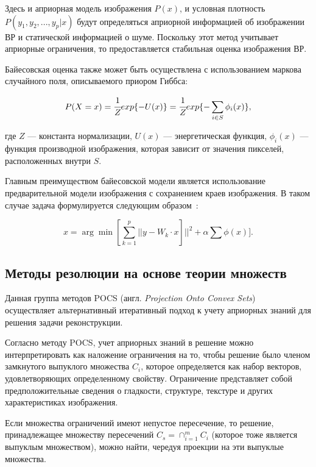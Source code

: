 Здесь и априорная модель изображения $P(x)$, и условная плотность $P(y_1, y_2, ..., y_p | x)$ будут определяться априорной информацией об изображении ВР и статической информацией о шуме. Поскольку этот метод учитывает априорные ограничения, то предоставляется стабильная оценка изображения ВР.

Байесовская оценка также может быть осуществлена с использованием маркова случайного поля, описываемого приором Гиббса:

\begin{equation}
    \displaystyle P(X = x) = \cfrac{1}{Z} exp\{-U(x)\} = \cfrac{1}{Z} exp\{-\sum_{i\in S}^{}\phi_i(x)\}, 
\end{equation}

где $Z$ --- константа нормализации, $U(x)$ --- энергетическая функция, $\phi_i(x)$ --- функция производной изображения, которая зависит от значения пикселей, расположенных внутри $S$.

Главным преимуществом байесовской модели является использование предварительной модели изображения с сохранением краев изображения. В таком случае задача формулируется следующим образом~\cite{map}:

\begin{equation}
    x = \arg \min [\sum_{k=1}^{p}||y - W_k\cdot x]||^2 + \alpha \sum_{}^{}\phi(x)].
\end{equation}

\subsection{Методы резолюции на основе теории множеств}

Данная группа методов POCS (англ. \textit{Projection Onto Convex Sets})~\cite{pocs, pocs2} осуществляет альтернативный итеративный подход к учету априорных знаний для решения задачи реконструкции.

Согласно методу POCS, учет априорных знаний в решение можно интерпретировать как наложение ограничения на то, чтобы решение было членом замкнутого выпуклого множества $C_i$, которое определяется как набор векторов, удовлетворяющих определенному свойству. Ограничение представляет собой предположительные сведения о гладкости, структуре, текстуре и других характеристиках изображения.

Если множества ограничений имеют непустое пересечение, то решение, принадлежащее множеству пересечений $C_s = \cap _{i=1}^{m}C_i$ (которое тоже является выпуклым множеством), можно найти, чередуя проекции на эти выпуклые множества.

